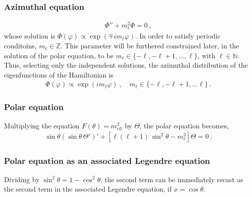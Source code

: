\documentclass[letterpaper,10pt,english]{jupyterBook}
\begin{document}
\subsubsection*{Azimuthal equation}
\begin{equation*}
\begin{split}\Phi'' + m_\ell^2 \Phi = 0 \ ,\end{split}
\end{equation*}
\sphinxAtStartPar
whose solution is \(\Phi(\varphi) \propto \exp \left( \mp i m_{\ell} \varphi \right)\). In order to satisfy periodic conditoins, \(m_{\ell} \in \mathbb{Z}\). This parameter will be furthered constrained later, in the solution of the polar equation, to be \(m_{\ell} \in \{ - \ell, -\ell+1, \dots, \ell \}\), with \(\ell \in \mathbb{N}\). Thus, selecting only the independent solutions, the azimuthal distribution of the eigenfunctions of the Hamiltonian is
\begin{equation*}
\begin{split}\Phi(\varphi) \propto \exp\left( i m_{\ell} \varphi \right) \ , \quad m_{\ell} \in \{ - \ell, -\ell+1, \dots \ell \} \ .\end{split}
\end{equation*}\subsubsection*{Polar equation}

\sphinxAtStartPar
Multiplying the equation \(F(\theta) = m_{ell}^2\) by \(\Theta\), the polar equation becomes,
\begin{equation*}
\begin{split} \sin \theta \left( \sin \theta \, \Theta' \right)' + \left[ \ell ( \ell + 1 ) \, \sin^2 \theta - m_{\ell}^2 \right] \Theta = 0 \ .\end{split}
\end{equation*}\subsubsection*{Polar equation as an associated Legendre equation}

\sphinxAtStartPar
Dividing by \(\sin^2 \theta= 1 - \cos^2 \theta\), the second term can be immediately recast as the second term in the associated Legendre equation, if \(x = \cos \theta\).
\end{document}
